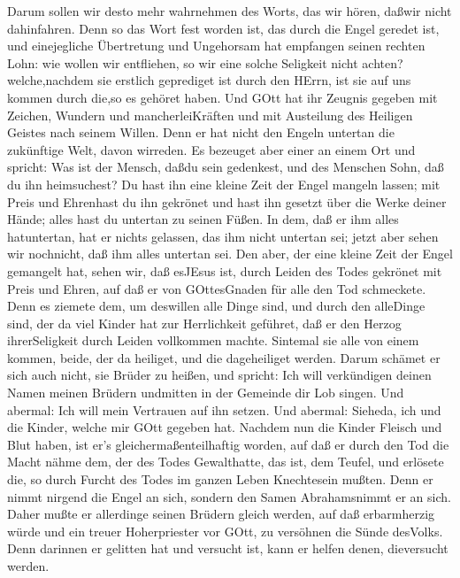  Darum sollen wir desto mehr wahrnehmen des Worts, das wir
hören, daßwir nicht dahinfahren.  Denn so das Wort fest
worden ist, das durch die Engel geredet ist, und einejegliche
Übertretung und Ungehorsam hat empfangen seinen rechten Lohn:
 wie wollen wir entfliehen, so wir eine solche Seligkeit
nicht achten? welche,nachdem sie erstlich geprediget ist durch den
HErrn, ist sie auf uns kommen durch die,so es gehöret haben.
 Und GOtt hat ihr Zeugnis gegeben mit Zeichen, Wundern und
mancherleiKräften und mit Austeilung des Heiligen Geistes nach seinem
Willen.  Denn er hat nicht den Engeln untertan die
zukünftige Welt, davon wirreden.  Es bezeuget aber einer an
einem Ort und spricht: Was ist der Mensch, daßdu sein gedenkest, und des
Menschen Sohn, daß du ihn heimsuchest?  Du hast ihn eine
kleine Zeit der Engel mangeln lassen; mit Preis und Ehrenhast du ihn
gekrönet und hast ihn gesetzt über die Werke deiner Hände; 
alles hast du untertan zu seinen Füßen. In dem, daß er ihm alles
hatuntertan, hat er nichts gelassen, das ihm nicht untertan sei; jetzt
aber sehen wir nochnicht, daß ihm alles untertan sei.  Den
aber, der eine kleine Zeit der Engel gemangelt hat, sehen wir, daß
esJEsus ist, durch Leiden des Todes gekrönet mit Preis und Ehren, auf
daß er von GOttesGnaden für alle den Tod schmeckete.  Denn
es ziemete dem, um deswillen alle Dinge sind, und durch den alleDinge
sind, der da viel Kinder hat zur Herrlichkeit geführet, daß er den
Herzog ihrerSeligkeit durch Leiden vollkommen machte. 
Sintemal sie alle von einem kommen, beide, der da heiliget, und die
dageheiliget werden. Darum schämet er sich auch nicht, sie Brüder zu
heißen,  und spricht: Ich will verkündigen deinen Namen
meinen Brüdern undmitten in der Gemeinde dir Lob singen. 
Und abermal: Ich will mein Vertrauen auf ihn setzen. Und abermal:
Sieheda, ich und die Kinder, welche mir GOtt gegeben hat. 
Nachdem nun die Kinder Fleisch und Blut haben, ist er's
gleichermaßenteilhaftig worden, auf daß er durch den Tod die Macht nähme
dem, der des Todes Gewalthatte, das ist, dem Teufel,  und
erlösete die, so durch Furcht des Todes im ganzen Leben Knechtesein
mußten.  Denn er nimmt nirgend die Engel an sich, sondern
den Samen Abrahamsnimmt er an sich.  Daher mußte er
allerdinge seinen Brüdern gleich werden, auf daß erbarmherzig würde und
ein treuer Hoherpriester vor GOtt, zu versöhnen die Sünde desVolks.
 Denn darinnen er gelitten hat und versucht ist, kann er
helfen denen, dieversucht werden.

